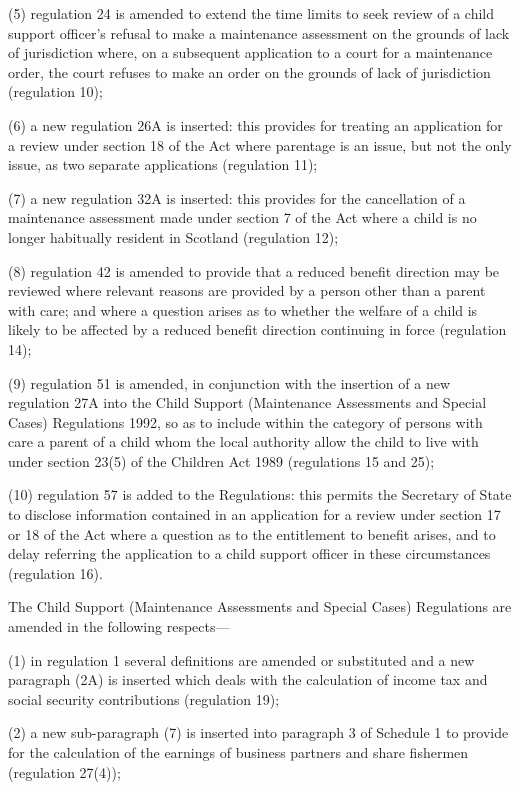 \documentclass[12pt,a4paper]{article}
\begin{document}
 (5) regulation 24 is amended to extend the time limits to seek review of a child support officer’s refusal to make a maintenance assessment on the grounds of lack of jurisdiction where, on a subsequent application to a court for a maintenance order, the court refuses to make an order on the grounds of lack of jurisdiction (regulation 10);

 (6) a new regulation 26A is inserted: this provides for treating an application for a review under section 18 of the Act where parentage is an issue, but not the only issue, as two separate applications (regulation 11);

 (7) a new regulation 32A is inserted: this provides for the cancellation of a maintenance assessment made under section 7 of the Act where a child is no longer habitually resident in Scotland (regulation 12);

 (8) regulation 42 is amended to provide that a reduced benefit direction may be reviewed where relevant reasons are provided by a person other than a parent with care; and where a question arises as to whether the welfare of a child is likely to be affected by a reduced benefit direction continuing in force (regulation 14);

 (9) regulation 51 is amended, in conjunction with the insertion of a new regulation 27A into the Child Support (Maintenance Assessments and Special Cases) Regulations 1992, so as to include within the category of persons with care a parent of a child whom the local authority allow the child to live with under section 23(5) of the Children Act 1989 (regulations 15 and 25);

 (10) regulation 57 is added to the Regulations: this permits the Secretary of State to disclose information contained in an application for a review under section 17 or 18 of the Act where a question as to the entitlement to benefit arises, and to delay referring the application to a child support officer in these circumstances (regulation 16).

 The Child Support (Maintenance Assessments and Special Cases) Regulations are amended in the following respects---

 (1) in regulation 1 several definitions are amended or substituted and a new paragraph (2A) is inserted which deals with the calculation of income tax and social security contributions (regulation 19);

 (2) a new sub-paragraph (7) is inserted into paragraph 3 of Schedule 1 to provide for the calculation of the earnings of business partners and share fishermen (regulation 27(4));
\end{document}

